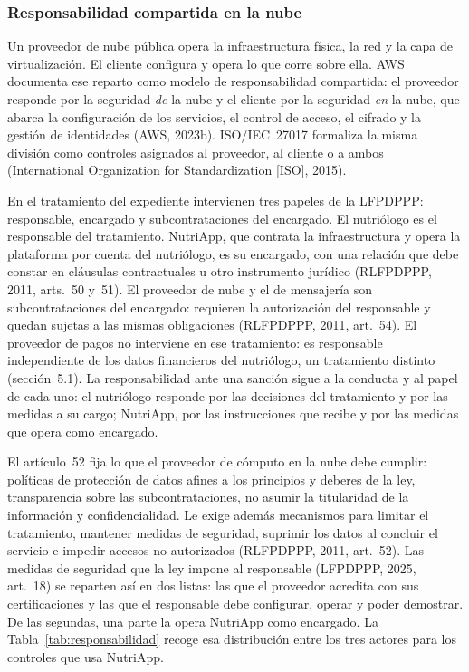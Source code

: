 \documentclass[12pt, a4paper]{article}
\begin{document}
\subsubsection{Responsabilidad compartida en la nube}
 
Un proveedor de nube pública opera la infraestructura física, la
red y la capa de virtualización. El cliente configura y opera lo
que corre sobre ella. AWS documenta ese reparto como modelo de
responsabilidad compartida: el proveedor responde por la seguridad
\textit{de} la nube y el cliente por la seguridad \textit{en} la
nube, que abarca la configuración de los servicios, el control de
acceso, el cifrado y la gestión de identidades (AWS, 2023b). ISO/IEC~27017 formaliza la misma división como
controles asignados al proveedor, al cliente o a ambos
(International Organization for Standardization [ISO], 2015).
 
En el tratamiento del expediente intervienen tres papeles de la
LFPDPPP: responsable, encargado y subcontrataciones del encargado. El
nutriólogo es el responsable del tratamiento. NutriApp, que
contrata la infraestructura y opera la plataforma por cuenta del
nutriólogo, es su encargado, con una relación que debe constar en
cláusulas contractuales u otro instrumento jurídico (RLFPDPPP,
2011, arts.~50 y~51). El proveedor de nube y el de mensajería son
subcontrataciones del encargado: requieren la autorización del
responsable y quedan sujetas a las mismas obligaciones (RLFPDPPP,
2011, art.~54). El proveedor de pagos no interviene en ese
tratamiento: es responsable independiente de los datos financieros
del nutriólogo, un tratamiento distinto (sección~5.1). La
responsabilidad ante una
sanción sigue a la conducta y al papel de cada uno: el nutriólogo
responde por las decisiones del tratamiento y por las medidas a su
cargo; NutriApp, por las instrucciones que recibe y por las
medidas que opera como encargado.
 
El artículo~52 fija lo que el proveedor de cómputo en la nube debe
cumplir: políticas de protección de datos afines a los principios
y deberes de la ley, transparencia sobre las subcontrataciones, no
asumir la titularidad de la información y confidencialidad. Le
exige además mecanismos para limitar el tratamiento, mantener
medidas de seguridad, suprimir los datos al concluir el servicio e
impedir accesos no autorizados (RLFPDPPP, 2011, art.~52). Las medidas de
seguridad que la ley impone al responsable (LFPDPPP, 2025, art.~18) se
reparten así en dos listas: las que el proveedor acredita con sus
certificaciones y las que el responsable debe configurar, operar y poder
demostrar. De las segundas, una parte la opera NutriApp como encargado.
La Tabla~\ref{tab:responsabilidad} recoge esa distribución entre los
tres actores para los controles que usa NutriApp.
 
\end{document}
